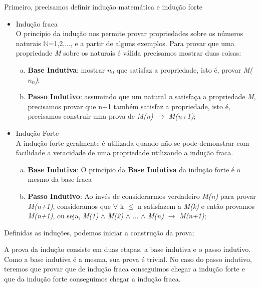\documentclass[a4paper, 10pt]{article}
\begin{document}
\vspace{5mm}Primeiro, precisamos definir indução matemática e indução forte
\begin{itemize}
\item Indução fraca\\ 
	O princípio da indução nos permite provar propriedades sobre os números naturais $\mathbb{N}$={1,2,...}, e a partir de alguns exemplos.
    Para provar que uma propriedade \textit{M} sobre os naturais é válida precisamos mostrar duas coisas:
    
	\begin{enumerate} [a)]	
    \item \textbf{Base Indutiva}: mostrar \textit{$n_0$} que satisfaz a propriedade, isto é, provar \textit{M(\textit{$n_0$})};
    \item \textbf{Passo Indutivo}: assumindo que um natural \textit{n} satisfaça a propriedade \textit{M}, precisamos provar que n+1 também satisfaz a propriedade, isto é, precisamos construir uma prova de \textit{M(n)} $\rightarrow$ \textit{ M(n+1)};
	\end{enumerate}
    
\item Indução Forte\\
	A indução forte geralmente é utilizada quando não se pode demonstrar com facilidade a veracidade de uma propriedade utilizando a indução fraca.    
    \begin{enumerate}[a)]
    \item \textbf{Base Indutiva}: O princípio da \textbf{Base Indutiva} da indução forte é o mesmo da base fraca
    \item \textbf{Passo Indutivo}: Ao invés de considerarmos verdadeiro \textit{M(n)} para provar \textit{ M(n+1)}, consideramos que $\forall$ k $\le$ n satisfazem a \textit{M(k)} e então provamos \textit{M(n+1)}, ou seja, \textit{M(1)} $\wedge$ \textit{M(2)} $\wedge$ ... $\wedge$ \textit{M(n)} $\rightarrow$ \textit{ M(n+1)};
    \end{enumerate}
\end{itemize}

Definidas as induções, podemos iniciar a construção da prova; 

A prova da indução consiste em duas etapas, a base indutiva e o passo indutivo.
Como a base indutiva é a mesma, sua prova é trivial.
No caso do passo indutivo, teremos que provar que de indução fraca conseguimos chegar a indução forte e que da indução forte conseguimos chegar a indução fraca.
\end{document}
